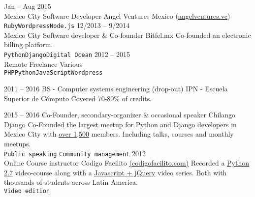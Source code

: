 \documentclass[9pt]{developercv} %
\begin{document}
\begin{entrylist}
    \entry
        {
            Jan -- Aug 2015
            \\\footnotesize{Mexico City}
        }
        {Software Developer}
        {Angel Ventures Mexico ({\href{http://www.angelventures.vc/}{\underline{angelventures.vc}}})}
        {\lorem \lorem \lorem\\ \texttt{Ruby}\slashsep\texttt{Wordpress}\slashsep\texttt{Node.js}}
    \entry
        {12/2013 -- 9/2014\\\footnotesize{Mexico City}}
        {Software developer \& Co-founder}
        {Bitfel.mx}
        {Co-founded an electronic billing platform. \\ \texttt{Python}\slashsep\texttt{Django}\slashsep\texttt{Digital Ocean}}
    \entry
        {2012 -- 2015\\\footnotesize{Remote}}
        {Freelance}
        {Various}
        {\lorem\lorem\\ \texttt{PHP}\slashsep\texttt{Python}\slashsep\texttt{JavaScript}\slashsep\texttt{Wordpress}}
\end{entrylist}



\begin{entrylist}
    \entry
        {2011 -- 2016}
        {BS - Computer systems engineering (drop-out)}
        {IPN - Escuela Superior de Cómputo}
        {Covered 70-80\% of credits.}
\end{entrylist}



\begin{entrylist}
    \entry
        {2015 -- 2016}
        {Co-Founder, secondary-organizer \& occasional speaker}
        {Chilango Django}
        {
            Co-Founded the largest meetup for Python and Django developers in Mexico
            City with
            {\href{https://meetup.com/Chilango-Django/}{\underline{over 1,500}}}
            members. Including talks, courses and monthly meetups.\\
                \texttt{Public speaking}\slashsep
                \texttt{Community management}
        }
    \entry
        {2012\\\footnotesize{Online}}
        {Course instructor}
        {Codigo Facilito {\href{(https://codigofacilito.com/}{(codigofacilito.com)}}}
        {Recorded a {\href{https://www.youtube.com/watch?v=CjmzDHMHxwU&list=PLE549A038CF82905F}{\underline{Python 2.7}}} video-course along with a {\href{https://www.youtube.com/watch?v=jKbjblt4NXA&list=PLpOqH6AE0tNi47LF-_6gddgq10lp_TLDB}{\underline{Javascript + jQuery}}}
        video series. Both with thousands of students across Latin America.\\
                \texttt{Video edition}
        }
\end{entrylist}
\end{document}
